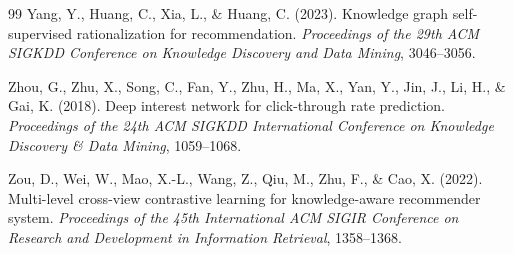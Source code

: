 \documentclass[12pt,a4paper]{article}
\begin{document}
\begin{thebibliography}{99}
Yang, Y., Huang, C., Xia, L., \& Huang, C. (2023). Knowledge graph self-supervised rationalization for recommendation. \textit{Proceedings of the 29th ACM SIGKDD Conference on Knowledge Discovery and Data Mining}, 3046--3056.

Zhou, G., Zhu, X., Song, C., Fan, Y., Zhu, H., Ma, X., Yan, Y., Jin, J., Li, H., \& Gai, K. (2018). Deep interest network for click-through rate prediction. \textit{Proceedings of the 24th ACM SIGKDD International Conference on Knowledge Discovery \& Data Mining}, 1059--1068.

Zou, D., Wei, W., Mao, X.-L., Wang, Z., Qiu, M., Zhu, F., \& Cao, X. (2022). Multi-level cross-view contrastive learning for knowledge-aware recommender system. \textit{Proceedings of the 45th International ACM SIGIR Conference on Research and Development in Information Retrieval}, 1358--1368.

\end{thebibliography}
\end{document}
